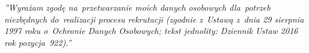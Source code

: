\documentclass[11pt,a4paper]{article}
\begin{document}

    \bigskip

    \noindent\textit{\small
        ''Wyrażam zgodę na~przetwarzanie moich danych osobowych dla~potrzeb niezbędnych do~realizacji procesu rekrutacji
        (zgodnie z~Ustawą z~dnia 29 sierpnia 1997 roku o~Ochronie Danych Osobowych; tekst jednolity: Dziennik Ustaw 2016
        rok pozycja~922).''}
\end{document}
